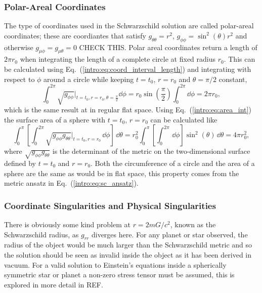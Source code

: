 \subsubsection*{Polar-Areal Coordinates }
The type of coordinates used in the Schwarzschild solution are called polar-areal coordinates; these are coordiantes that satisfy $g_{\theta\theta}=r^2$, $g_{\phi\phi} = \sin^2(\theta)r^2$ and otherwise $g_{\mu\phi}=g_{\mu\theta}=0$ CHECK THIS. Polar areal coordinates return a length of $2\pi r_0$ when integrating the length of a complete circle at fixed radius $r_0$. This can be calculated using Eq.~(\ref{intro:eq:coord_interval_length}) and integrating with respect to $\phi$ around a circle while keeping $t=t_0$, $r=r_0$ and $\theta=\pi/2$ constant,
\begin{equation}
\int_0^{2\pi} \sqrt{g_{\phi\phi}}\Big|_{t=t_0,r=r_0,\theta=\frac{\pi}{2}} \dd \phi =  r_0 \sin \left(\frac{\pi}{2}\right) \int_0^{2\pi} \dd \phi = 2 \pi r_0,
\end{equation}
which is the same result at in regular flat space. Using Eq.~(\ref{intro:eq:area_int}) the surface area of a sphere with $t=t_0$, $r=r_0$ can be calculated like
\begin{equation}
\int_0^\pi\left[\int_0^{2\pi} \sqrt{g_{\phi\phi} g_{\theta\theta}}\Big|_{t=t_0,r=r_0} \,\dd \phi\right] \,\dd \theta=  r_0^2 \int_0^\pi\left[\int_0^{2\pi} \,\dd \phi\right]  \sin^2(\theta)\,\dd \theta = 4 \pi r_0^2,
\end{equation}
where $\sqrt{g_{\phi\phi} g_{\theta\theta}}$ is the determinant of the metric on the two-dimensional surface defined by $t=t_0$ and $r=r_0$. Both the circumference of a circle and the area of a sphere are the same as would be in flat space, this property comes from the metric ansatz in Eq.~(\ref{intro:eq:sc_ansatz}).












\subsubsection{Coordinate Singularities and Physical Singularities}
There is obviously some kind problem at $r=2mG/c^2$, known as the Schwarzschild radius, as $g_{rr}$ diverges here. For any planet or star observed, the radius of the object would be much larger than the Schwarzschild metric and so the solution should be seen as invalid inside the object as it has been derived in vacuum. For a valid solution to Einstein's equations inside a spherically symmetric star or planet a non-zero stress tensor must be assumed, this is explored in more detail in REF.


